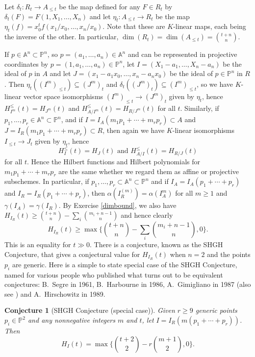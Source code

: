 \documentclass[11pt,twoside]{amsart}
\numberwithin{equation}{section}
\newtheorem{conjecture}[theorem]{Conjecture}
\theoremstyle{definition}
\begin{document}
Let $\delta_t:R_t\to A_{\leq t}$ be the map defined for any $F\in R_t$
by $\delta_t(F)=F(1,X_1,\ldots,X_n)$
and let $\eta_t:A_{\leq t}\to R_t$ be the map $\eta_t(f)=x_0^tf(x_1/x_0,\ldots,x_n/x_0)$.
Note that these are ${K}$-linear maps, each being the inverse of the other.
In particular, $\dim(R_t)=\dim(A_{\leq t})=\binom{t+n}{n}$.

If $p\in{\mathbb{A}^{{n}}}\subset{\mathbb{P}^{{n}}}$, so $p=(a_1,\ldots,a_n)\in {\mathbb{A}^{n}}$ and can be 
represented in projective coordinates by $p=(1,a_1,\ldots,a_n)\in{\mathbb{P}^{n}}$,
let $I=(X_1-a_1,\ldots,X_n-a_n)$ be the ideal of $p$ in $A$
and let $J=(x_1-a_1x_0,\ldots, x_n-a_nx_0)$ be the ideal of $p\in {\mathbb{P}^{n}}$
in $R$. Then $\eta_t((I^m)_{\leq t})\subseteq (J^m)_t$ and
$\delta_t((J^m)_t)\subseteq (I^m)_{\leq t}$, so 
we have ${K}$-linear vector space isomorphisms
$(I^m)_{\leq t}\to(J^m)_t$ given by $\eta_t$, hence $H^\leq_{I^m}(t)=H_{J^m}(t)$
and $H^\leq_{A/I^m}(t)=H_{R/J^m}(t)$ for all $t$.
Similarly, if $p_1,\ldots,p_r\in {\mathbb{A}^{{n}}}\subset{\mathbb{P}^{n}}$, and if
$I=I_A(m_1p_1+\cdots+m_rp_r)\subset A$ and 
$J=I_R(m_1p_1+\cdots+m_rp_r)\subset R$, then again
we have ${K}$-linear isomorphisms
$I_{\leq t}\to J_t$ given by $\eta_t$, hence  
\begin{equation}\label{affprofeq}
H^\leq_I(t)=H_J(t) \text{ and } H^\leq_{A/I}(t)=H_{R/J}(t)
\end{equation}
for all $t$.
Hence the Hilbert functions and Hilbert polynomials
for $m_1p_1+\cdots+m_rp_r$ are the same whether we regard them 
as affine or projective subschemes.
In particular, if $p_1,\ldots,p_r\subset {\mathbb{A}^{{n}}}\subset{\mathbb{P}^{{n}}}$
and if $I_A=I_A(p_1+\cdots+p_r)$ and $I_R=I_R(p_1+\cdots+p_r)$,
then $\alpha(I_R^{(m)})=\alpha(I_A^m)$ for all $m\geq 1$ and
$\gamma(I_A)=\gamma(I_R)$. By Exercise \ref{dimbound}, we also have
$H_{I_R}(t)\geq \binom{t+n}{n}-\sum_i\binom{m_i+n-1}{n}$ and hence clearly
$$H_{I_R}(t)\geq \max\Big\{\binom{t+n}{n}-\sum_i\binom{m_i+n-1}{n},0\Big\}.$$
This is an equality for $t\gg0$. 
There is a conjecture, known as the SHGH Conjecture, that gives a conjectural value
for $H_{I_R}(t)$ when $n=2$ and the points $p_i$ are generic.
Here is a simple to state special case of the SHGH Conjecture, named
for various people who published
what turns out to be equivalent conjectures:
B.\ Segre \cite{refSe} in 1961, B.\ Harbourne \cite{refVanc} in 1986, 
A.\ Gimigliano \cite{refG} in 1987 (also see \cite{refG2}) and A.\ Hirschowitz \cite{refHi} in 1989.

\begin{conjecture}[SHGH Conjecture (special case)]\label{SHGHconjSpecCase}
Given $r\geq9$ generic points $p_i\in{\mathbb{P}^{2}}$ and any nonnegative integers $m$ and $t$,
let $I=I_R(m(p_1+\cdots+p_r))$. Then
$$H_{I}(t)=\max\Big\{\binom{t+2}{2}-r\binom{m+1}{2},0\Big\}.$$
\end{conjecture}
\end{document}
